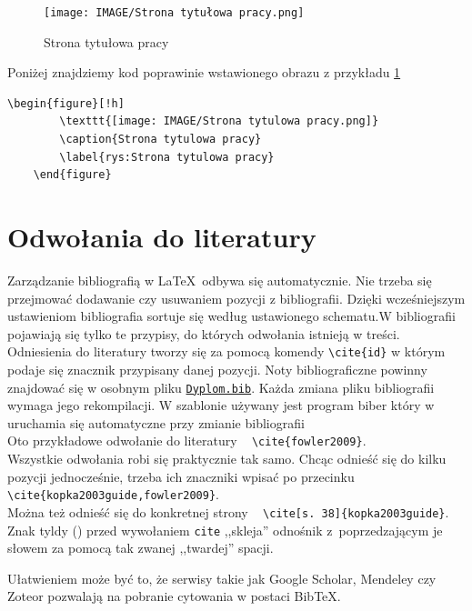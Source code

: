 \begin{figure}[!ht]
	\centering 
 \texttt{[image: IMAGE/Strona tytułowa pracy.png]}
	\caption{Strona tytułowa pracy}
	\label{rys:Strona tytułowa pracy}
\end{figure}
Poniżej znajdziemy kod poprawinie wstawionego obrazu z przykładu \ref{rys:Strona tytułowa pracy}
\begin{lstlisting}[caption={Kod poprawnie wstawionego obrazu}, label=lst:Kod poprawnie wstawionego obrazu]
	\begin{figure}[!h]
		\texttt{[image: IMAGE/Strona tytulowa pracy.png]}
		\caption{Strona tytulowa pracy}
		\label{rys:Strona tytulowa pracy}
	\end{figure}
\end{lstlisting}


\section{Odwołania do literatury}
Zarządzanie bibliografią w \LaTeX\ odbywa się automatycznie. Nie trzeba się przejmować dodawanie czy usuwaniem pozycji z bibliografii. Dzięki wcześniejszym ustawieniom bibliografia sortuje się według ustawionego schematu.W bibliografii pojawiają się tylko te przypisy, do których odwołania istnieją w treści.
Odniesienia do literatury tworzy się za pomocą komendy \texttt{\textbackslash cite\{id\}} w którym podaje się znacznik przypisany danej pozycji. Noty bibliograficzne powinny znajdować się w osobnym pliku \href{./Dyplom.bib}{\texttt{Dyplom.bib}}. Każda zmiana pliku bibliografii wymaga jego rekompilacji.
W szablonie używany jest program biber który w \overleaflink uruchamia się automatyczne przy zmianie bibliografii\\
Oto przykładowe odwołanie do literatury ~\cite{fowler2009} \texttt{\textbackslash cite\{fowler2009\}}.\\
Wszystkie odwołania robi się praktycznie tak samo. Chcąc odnieść się do kilku pozycji jednocześnie, trzeba ich znaczniki wpisać po przecinku ~\cite{kopka2003guide,fowler2009} \texttt{\textbackslash cite\{kopka2003guide,fowler2009\}}.\\
Można też odnieść się do konkretnej strony ~\cite[s.~38]{kopka2003guide} \texttt{\textbackslash cite[s.~38]\{kopka2003guide\}}.\\
Znak tyldy (\keys{\textasciitilde{}}) przed wywołaniem \texttt{cite} ,,skleja'' odnośnik z~poprzedzającym je słowem za pomocą tak zwanej ,,twardej'' spacji.

Ułatwieniem może być to, że serwisy takie jak Google Scholar, Mendeley czy Zoteor pozwalają na pobranie cytowania w postaci BibTeX.

